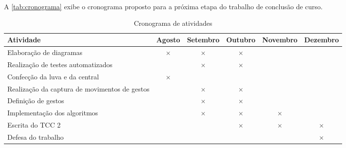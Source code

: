 \label{chapter:cronograma}

A \autoref{tab:cronograma} exibe o cronograma proposto para a próxima etapa do trabalho de conclusão de curso.

\begin{table}[htbp]
  \centering
  \caption{Cronograma de atividades}
  \label{tab:cronograma}
  \begin{tabularx}{\textwidth}{|X|c|c|c|c|c|}
    \hline
    \textbf{Atividade} & \textbf{Agosto} & \textbf{Setembro} & \textbf{Outubro} & \textbf{Novembro} & \textbf{Dezembro} \\
    \hline
    Elaboração de diagramas & \(\times\) & \(\times\) & \(\times\) & & \\
    \hline
    Realização de testes automatizados &  & \(\times\) &  \(\times\) & & \\
    \hline
    Confecção da luva e da central & \(\times\) & & & & \\
    \hline
    Realização da captura de movimentos de gestos & & \(\times\) & \(\times\) & &  \\
    \hline
    Definição de gestos & & \(\times\) & \(\times\)  & &  \\
    \hline
    Implementação dos algoritmos & & \(\times\) & \(\times\)  & \(\times\) & \\
    \hline
    Escrita do TCC 2 & & & \(\times\)  & \(\times\) & \(\times\)\\
    \hline
    Defesa do trabalho & & & &  & \(\times\) \\
    \hline
  \end{tabularx}
\end{table}

\cite{cortes:1995svm}
